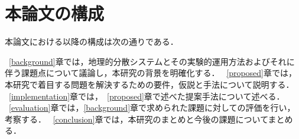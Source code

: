 \section{本論文の構成}
本論文における以降の構成は次の通りである．

~\ref{background}章では，地理的分散システムとその実験的運用方法およびそれに伴う課題点について議論し，本研究の背景を明確化する．
~\ref{proposed}章では，本研究で着目する問題を解決するための要件，仮説と手法について説明する．
~\ref{implementation}章では，~\ref{proposed}章で述べた提案手法について述べる．
~\ref{evaluation}章では，\ref{background}章で求められた課題に対しての評価を行い，考察する．
~\ref{conclusion}章では，本研究のまとめと今後の課題についてまとめる．


